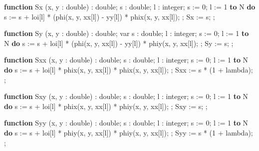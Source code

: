 {{{\medskip 
\filbreak 
\vskip-12pt 
 {\bf function} Sx (x, y : double) : double; 
\smallskip 
      \iB s : double; 
      \iB l : integer; 
\smallskip 
   \iA s := 0; 
    l := 1 {\bf to} N {\bf do} 
      \iB s := s + loi[l] * (phi(x, y, xx[l]) - yy[l]) * phix(x, y, xx[l]); 
      ; 
   \iA Sx := s; 
   ; 
 
\medskip 
\filbreak 
\vskip-12pt 
{\bf  function} Sy (x, y : double) : double; 
\smallskip 
   \iA var 
   \iB  s : double; 
   \iB  l : integer; 
\smallskip 
   \iA s := 0; 
    l := 1 {\bf to} N {\bf do} 
     \iB s := s + loi[l] * (phi(x, y, xx[l]) - yy[l]) * phiy(x, y, xx[l]); 
    ; 
   \iA Sy := s; 
  ; 
 
\medskip 
\filbreak 
\vskip-12pt 
 {\bf function} Sxx (x, y : double) : double; 
\smallskip 
    \iB s : double; 
    \iB l : integer; 
\smallskip 
   \iA s := 0; 
    l := 1 {\bf to} N {\bf do} 
     \iB s := s + loi[l] * phix(x, y, xx[l]) * phix(x, y, xx[l]); 
    ; 
   \iA Sxx := s * (1 + lambda); 
  ; 
 
\medskip 
\filbreak 
\vskip-12pt 
 {\bf function} Sxy (x, y : double) : double; 
\smallskip 
   \iB  s : double; 
   \iB  l : integer; 
\smallskip 
   \iA s := 0; 
    l := 1 {\bf to} N {\bf do} 
    \iB  s := s + loi[l] * phix(x, y, xx[l]) * phiy(x, y, xx[l]); 
    ; 
   \iA Sxy := s; 
  ; 
 
\medskip 
\filbreak 
\vskip-12pt 
 {\bf function} Syy (x, y : double) : double; 
\smallskip 
     \iB s : double; 
     \iB l : integer; 
\smallskip 
   \iA s := 0; 
    l := 1 {\bf to} N {\bf do} 
     \iB s := s + loi[l] * phiy(x, y, xx[l]) * phiy(x, y, xx[l]); 
     ; 
  \iA  Syy := s * (1 + lambda); 
  ; 
 
}}}
